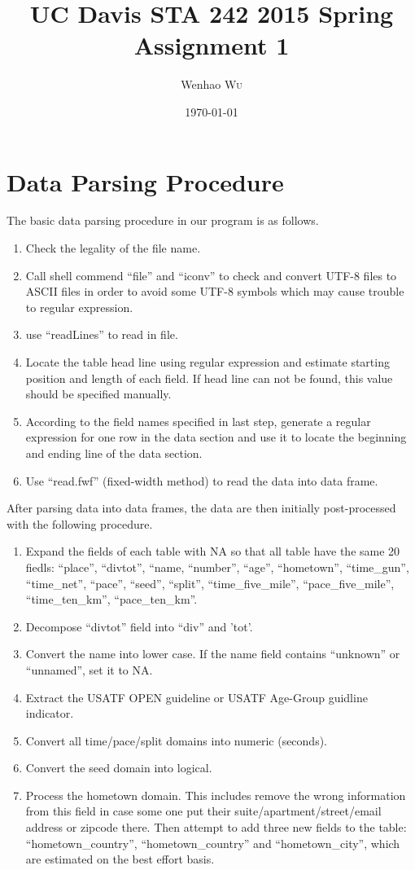 \documentclass[twocolumn]{article}
\title{UC Davis STA 242 2015 Spring Assignment 1} %
\author{Wenhao \textsc{Wu}} %
\date{\today} %
\begin{document}
\maketitle %


\section{Data Parsing Procedure}
The basic data parsing procedure in our program is as follows.
\begin{enumerate}
    \item Check the legality of the file name.
    \item Call shell commend ``file'' and ``iconv'' to check and convert UTF-8
    files to ASCII files in order to avoid some UTF-8 symbols which may cause
    trouble to regular expression.
    \item use ``readLines'' to read in file.
    \item Locate the table head line using regular expression and estimate
    starting position and length of each field. If head line can not be found,
    this value should be specified manually.
    \item According to the field names specified in last step, generate a
    regular expression for one row in the data section and use it to locate the
    beginning and ending line of the data section.
    \item Use ``read.fwf'' (fixed-width method) to read the data into data
    frame.
\end{enumerate}
After parsing data into data frames, the data are then initially post-processed
with the following procedure.
\begin{enumerate}
    \item Expand the fields of each table with NA so that all table have the
    same 20 fiedls: ``place'', ``divtot'', ``name, ``number'', ``age'',
    ``hometown'', ``time\_gun'', ``time\_net'', ``pace'', ``seed'', ``split'',
    ``time\_five\_mile'', ``pace\_five\_mile'', ``time\_ten\_km'',
    ``pace\_ten\_km''.
    \item Decompose ``divtot'' field into ``div'' and 'tot'.
    \item Convert the name into lower case. If the name field contains
    ``unknown'' or ``unnamed'', set it to NA.
    \item Extract the USATF OPEN guideline or USATF Age-Group guidline
    indicator.
    \item Convert all time/pace/split domains into numeric (seconds).
    \item Convert the seed domain into logical.
    \item Process the hometown domain. This includes remove the wrong
    information from this field in case some one put their
    suite/apartment/street/email address or zipcode there. Then attempt to
    add three new fields to the table: ``hometown\_country'',
    ``hometown\_country'' and ``hometown\_city'', which are estimated on the
    best effort basis.
\end{enumerate}
\end{document}

